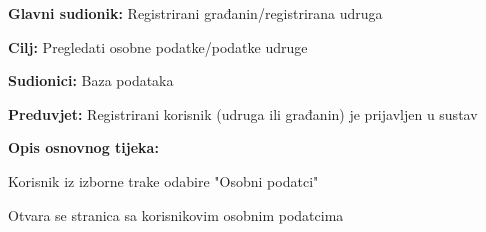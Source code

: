 		
				\noindent {}
			\begin{packed_item}
				
				\item \textbf{Glavni sudionik:} Registrirani građanin/registrirana udruga
				\item  \textbf{Cilj:} Pregledati osobne podatke/podatke udruge
				\item  \textbf{Sudionici:} Baza podataka
				\item  \textbf{Preduvjet:} Registrirani korisnik (udruga ili građanin) je prijavljen u sustav
				\item  \textbf{Opis osnovnog tijeka:}
				
				\item[] \begin{packed_enum}	
					\item Korisnik iz izborne trake odabire "Osobni podatci"
					\item Otvara se stranica sa korisnikovim osobnim podatcima
				\end{packed_enum}
			\end{packed_item}
		
		
		
